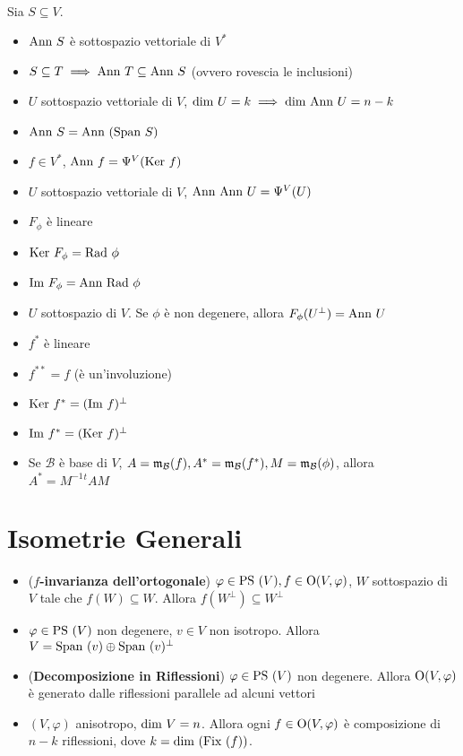 \documentclass[a4paper,NoNotes,GeneralMath]{stdmdoc}
\begin{document}
	 \\ Sia $S \subseteq V$.
	\begin{itemize}
		\item $\mbox{Ann } S$ è sottospazio vettoriale di $V^{*}$
		\item $S \subseteq T \implies \mbox{Ann } T \subseteq \mbox{Ann } S$ (ovvero rovescia le inclusioni)
		\item $U$ sottospazio vettoriale di $V$, $\mbox{dim } U = k \implies \mbox{dim } \mbox{Ann } U = n - k$
		\item $\mbox{Ann } S = \mbox{Ann } (\mbox{Span } S)$
		\item $f \in V^{*}$, $\mbox{Ann } f = \Psi^{V}(\mbox{Ker } f)$
		\item $U$ sottospazio vettoriale di $V$, $\mbox{Ann } \mbox{Ann } U = \Psi^{V} (U)$
	\end{itemize}

	\begin{itemize}
		\item $F_{\phi}$ è lineare
		\item $\mbox{Ker } F_{\phi} = \mbox{Rad } \phi$
		\item $\mbox{Im } F_{\phi} = \mbox{Ann } \mbox{Rad } \phi$
		\item $U$ sottospazio di $V$. Se $\phi$ è non degenere, allora $F_{\phi}(U^\bot) = \mbox{Ann } U$
	\end{itemize}

	\begin{itemize}
		\item $f^{*}$ è lineare
		\item $f^{**} = f$ (è un'involuzione)
		\item $\mbox{Ker } f^{*} = (\mbox{Im } f)^\bot$
		\item $\mbox{Im } f^{*} = (\mbox{Ker } f)^\bot$
		\item Se $\mathcal{B}$ è base di $V$, $A = \mathfrak{m}_{\mathcal{B}}(f), A^{*} = \mathfrak{m}_{\mathcal{B}}(f^{*}), M = \mathfrak{m}_{\mathcal{B}}(\phi)$, allora $A^{*} = M^{-1}{}^tAM$
	\end{itemize}

	\section*{Isometrie Generali}
	\begin{itemize}
		\item ({\bf $f$-invarianza dell'ortogonale}) $\varphi\in\mbox{PS }(V), f\in\mbox{O}(V,\varphi)$, $W$ sottospazio di $V$ tale che $f(W)\subseteq W$. Allora $f(W^\bot)\subseteq W^\bot$
		\item $\varphi\in\mbox{PS }(V)$ non degenere, $v\in V$ non isotropo. Allora $V=\mbox{Span }(v)\oplus\mbox{Span }(v)^\bot$
		\item ({\bf Decomposizione in Riflessioni}) $\varphi\in\mbox{PS }(V)$ non degenere. Allora $\mbox{O}(V,\varphi)$ è generato dalle riflessioni parallele ad alcuni vettori
		\item $(V,\varphi)$ anisotropo, $\mbox{dim } V = n$. Allora ogni $f\in\mbox{O}(V,\varphi)$ è composizione di $n-k$ riflessioni, dove $k = \mbox{dim }(\mbox{Fix }(f))$.
	\end{itemize}
\end{document}
